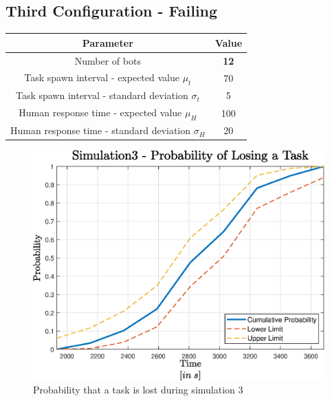 \documentclass[10pt,a4paper]{article}
\begin{document}
		\subsection{Third Configuration - Failing}
			\label{sub:sim3}
			\begin{center}
				\begin{tabular}{ |c|c|}
					\hline
					Parameter & Value\\
					\hline
					\hline
					Number of bots & \textbf{12}\\
					\hline
					Task spawn interval - expected value $\mu_t$ & 70\\
					\hline					
					Task spawn interval - standard deviation $\sigma_t$ & 5\\
					\hline
					Human response time - expected value $\mu_H$ & 100\\
					\hline					
					Human response time - standard deviation $\sigma_H$ & 20\\
					\hline
				\end{tabular}
			\end{center}
			\begin{figure}[H]
				\centering
					\includegraphics[scale = 0.7]{Images/Simulation3}
					\caption{Probability that a task is lost during simulation 3}
					\label{fig:sim3}
			\end{figure}
\end{document}
